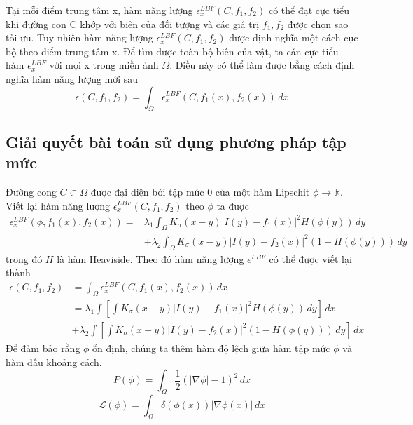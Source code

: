 \documentclass[14pt,oneside,a4paper]{extreport}
\begin{document}
Tại mỗi điểm trung tâm x, hàm năng lượng $\epsilon_x^{LBF}(C,f_1, f_2)$   có thể đạt cực tiểu khi đường con C khớp với biên của đối tượng và các giá trị $f_1, f_2$ được chọn sao tối ưu. Tuy nhiên hàm năng lượng $\epsilon_x^{LBF}(C,f_1, f_2)$ được định nghĩa một cách cục bộ theo điểm trung tâm x. Để tìm được toàn bộ biên của vật, ta cần cực tiểu hàm $\epsilon_x^{LBF}$  với mọi x trong miền ảnh $\Omega$. Điều này có thể làm được bằng cách định nghĩa hàm năng lượng mới sau
\begin{equation}
\epsilon(C, f_1, f_2)=\int_{\Omega} \epsilon_x^{LBF}(C, f_1(x), f_2(x))\,dx
\end{equation}
\subsection{Giải quyết bài toán sử dụng phương pháp tập mức}
Đường cong $C \subset \Omega$ được đại diện bởi tập mức 0 của một hàm Lipschit $\phi \rightarrow \mathbb{R}$. Viết lại hàm năng lượng $\epsilon_x^{LBF}(C,f_1, f_2)$ theo $\phi$ ta được
\begin{equation*}
\begin{split}
\epsilon_x^{LBF}(\phi, f_1(x), f_2(x))
=&\lambda_1 \int_{\Omega} K_{\sigma}(x-y)|I(y)-f_1(x)|^2H(\phi(y))\,dy\\ &+ \lambda_2 \int_{\Omega} K_{\sigma}(x-y)|I(y)-f_2(x)|^2(1-H(\phi(y)))\,dy 
\end{split}
\end{equation*}
trong đó $H$ là hàm Heaviside. Theo đó hàm năng lượng $\epsilon^{LBF}$ có thể được viết lại thành
\begin{equation*}
\begin{split}
\epsilon(C, f_1, f_2)&=\int_{\Omega} \epsilon_x^{LBF}(C, f_1(x), f_2(x))\,dx\\
&=\lambda_1 \int[\int K_{\sigma}(x-y)|I(y)-f_1(x)|^2H(\phi(y))\,dy]\,dx \\
&+ \lambda_2 \int[\int K_{\sigma}(x-y)|I(y)-f_2(x)|^2(1-H(\phi(y)))\,dy ]\,dx
\end{split}
\end{equation*}
Để đảm bảo rằng $\phi$ ổn định, chúng ta thêm hàm độ lệch giữa hàm tập mức $\phi$ và hàm dấu khoảng cách.
\begin{equation*}
P(\phi)= \int_{\Omega}\dfrac{1}{2}(|\nabla \phi|-1)^2\,dx
\end{equation*}
\begin{equation*}
\mathcal{L}(\phi)=\int_{\Omega}\delta(\phi(x))|\nabla \phi(x)|\,dx
\end{equation*}
\end{document}
